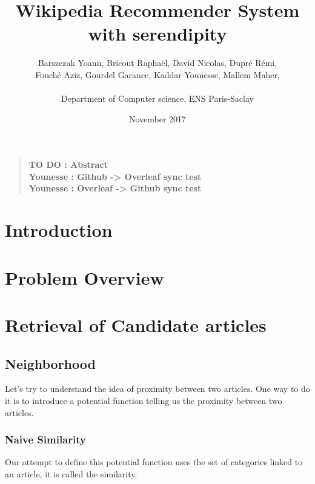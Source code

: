 \documentclass[11pt]{article}
\title{Wikipedia Recommender System with serendipity}
\author
    {
      Barszezak Yoann, Bricout Rapha\"el, David Nicolas, Dupr\'e R\'emi,\\
      Fouch\'e Aziz, Gourdel Garance, Kaddar Younesse, Mallem Maher,\\
      \\
      \normalsize{Department of Computer science, ENS Paris-Saclay}\\
    }
\date{November 2017}
\theoremstyle{plain}
\theoremstyle{definition}
\theoremstyle{remark}
\newenvironment{sciabstract}{
\begin{quote} \bf}
{\end{quote}}
\begin{document}
 


\baselineskip10pt


\maketitle 




\begin{sciabstract}
  TO DO : Abstract\\
  Younesse : Github -> Overleaf sync test\\
  Younesse : Overleaf -> Github sync test
\end{sciabstract}




\section{Introduction}


\section{Problem Overview}




\section{Retrieval of Candidate articles}

\subsection{Neighborhood}

Let's try to understand the idea of proximity between two articles. One way to do it is to introduce a potential function telling us the proximity between two articles.

\subsubsection{Naive Similarity}

Our attempt to define this potential function uses the set of categories linked to an article, it is called the similarity.
\end{document}
